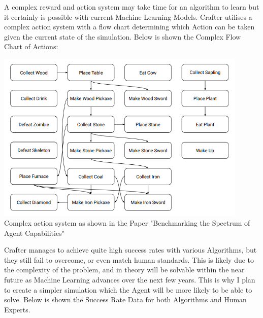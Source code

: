 \begin{flushleft}
                        \vspace{0.2cm}

                        A complex reward and action system may take time for an algorithm to learn but it certainly is possible with current
                        Machine Learning Models. Crafter utilises a complex action system with a flow chart determining which Action can be taken
                        given the current state of the simulation. Below is shown the Complex Flow Chart of Actions: \\

                        \vspace{0.2cm}
                        \begin{center}
                            \includegraphics[width=12cm]{Images/InitialResearch/CrafterComplexActionSystem.PNG} \\
                            Complex action system as shown in the Paper "Benchmarking the Spectrum of Agent Capabilities" \\
                        \end{center}
                        \vspace{0.2cm}

                        Crafter manages to achieve quite high success rates with various Algorithms, but they still fail to overcome, or even match
                        human standards. This is likely due to the complexity of the problem, and in theory will be solvable within the near future
                        as Machine Learning advances over the next few years. This is why I plan to create a simpler simulation which the Agent will
                        be more likely to be able to solve. Below is shown the Success Rate Data for both Algorithms and Human Experts. \\


\end{flushleft}
